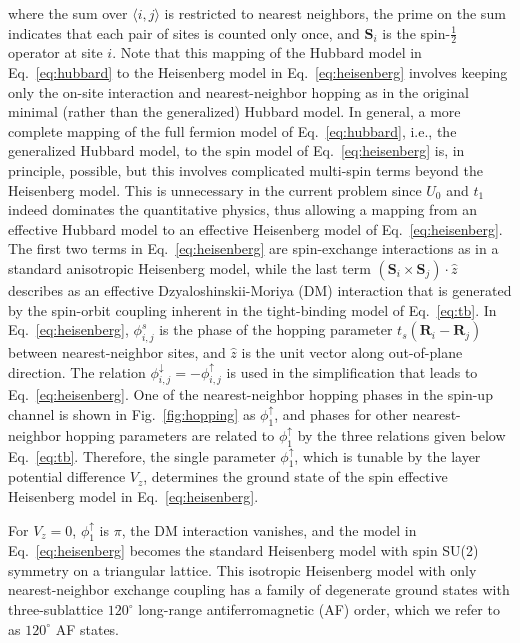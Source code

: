 \documentclass[aps,prx,floatfix,twocolumn]{revtex4-1}
\begin{document}
	where the sum over $\langle i,j \rangle$ is restricted to nearest neighbors, the prime on the sum indicates that each pair of sites is counted only once, and $ \bm{S}_i $ is the spin-$ \frac{1}{2} $ operator at site $i$. Note that this mapping of the Hubbard model in Eq.~\eqref{eq:hubbard} to the Heisenberg model in Eq.~\eqref{eq:heisenberg} involves keeping only the on-site interaction and nearest-neighbor hopping as in the original minimal (rather than the generalized) Hubbard model.  In general, a more complete mapping of the full fermion model of Eq.~\eqref{eq:hubbard}, i.e., the generalized Hubbard model, to the spin model of Eq.~\eqref{eq:heisenberg} is, in principle, possible, but this involves complicated multi-spin terms beyond the Heisenberg model. This is unnecessary in the current problem since $ U_0 $ and $ t_1 $ indeed dominates the quantitative physics, thus allowing a mapping from an effective Hubbard model to an effective Heisenberg model of Eq.~\eqref{eq:heisenberg}. The first two terms in Eq.~\eqref{eq:heisenberg} are spin-exchange interactions as in a standard anisotropic Heisenberg model, while the last term $\left(\bm{S}_{i}\times\bm{S}_{j}\right)\cdot \hat{z}$ describes as an effective Dzyaloshinskii-Moriya (DM) interaction that is generated by the spin-orbit coupling inherent in the tight-binding model of Eq.~\eqref{eq:tb}. In Eq.~\eqref{eq:heisenberg}, $ \phi_{i,j}^s$ is the phase of the hopping parameter $t_{s}\left(\bm{R}_i-\bm{R}_j\right)$ between nearest-neighbor sites, and $ \hat{z} $ is the unit vector along out-of-plane direction. The relation $ \phi_{i,j}^{\downarrow} = -\phi_{i,j}^{\uparrow}$ is used in the simplification that leads to Eq.~\eqref{eq:heisenberg}.  One of the nearest-neighbor hopping phases in the spin-up channel is shown in Fig.~\ref{fig:hopping} as $ \phi_{1}^{\uparrow} $, and phases for other nearest-neighbor hopping parameters are related to $ \phi_{1}^{\uparrow} $ by the three relations given below Eq.~\eqref{eq:tb}. Therefore, the single parameter $ \phi_{1}^{\uparrow} $, which is tunable by the layer potential difference $V_z$, determines the ground state of the spin effective Heisenberg model in Eq.~\eqref{eq:heisenberg}.
	
	For $V_z=0$, $ \phi_{1}^{\uparrow} $ is $\pi$,  the DM interaction vanishes, and the model in Eq.~\eqref{eq:heisenberg} becomes the standard Heisenberg model with spin SU(2) symmetry on a triangular lattice. This isotropic Heisenberg model with only nearest-neighbor exchange coupling has a family of degenerate ground states with  three-sublattice $120^{\circ}$ long-range antiferromagnetic (AF) order, which we refer to as $120^{\circ}$ AF states.
	
\end{document}
